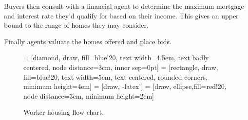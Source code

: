 Buyers then consult with a financial agent to determine the maximum mortgage and interest rate they'd qualify for based on their income. This gives an upper bound to the range of homes they may consider. 

Finally agents valuate the homes offered and place bids. %

%
%
%

\begin{figure}[htb]
    \begin{center}
  = [diamond, draw, fill=blue!20, 
     text width=4.5em, text badly centered, node distance=3cm, inner sep=0pt]
  = [rectangle, draw, fill=blue!20, 
     text width=5em, text centered, rounded corners, minimum height=4em]
  = [draw, -latex']
  = [draw, ellipse,fill=red!20, node distance=3cm,
     minimum height=2em]
%
 \begin{center}
 \end{center}
    \caption{Worker housing flow chart.}
    \label{fig-code-worker-choice}
    \end{center}
\end{figure}


